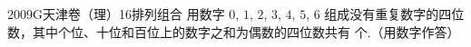 
\begin{problem}{2009}{G}{天津卷（理）}{16}{排列组合}
用数字 $0$, $1$, $2$, $3$, $4$, $5$, $6$ 组成没有重复数字的四位数，其中个位、十位和百位上的数字之和为偶数的四位数共有 \underline{\hspace{4em}} 个.（用数字作答）
\end{problem}

\begin{answer}

\end{answer}

\begin{solutions}

\end{solutions}